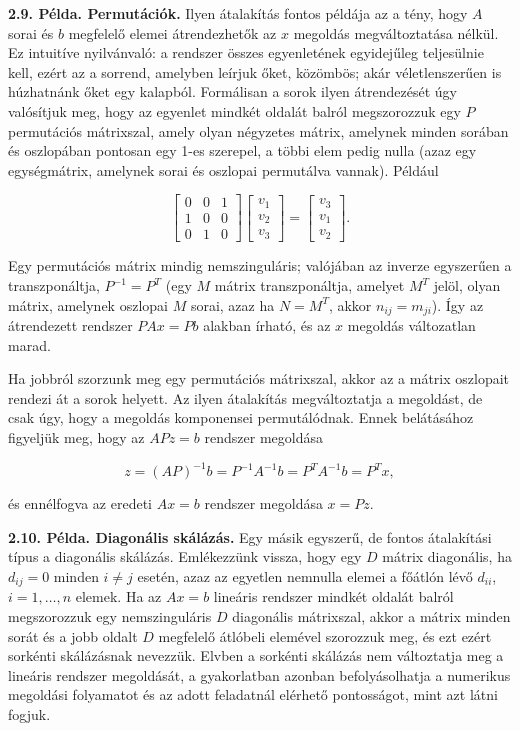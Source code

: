 \documentclass[
  magyar,
  11pt]{article}
\begin{document}
\textbf{2.9. Példa. Permutációk.} Ilyen átalakítás fontos példája az a
tény, hogy \(A\) sorai és \(b\) megfelelő elemei átrendezhetők az \(x\)
megoldás megváltoztatása nélkül. Ez intuitíve nyilvánvaló: a rendszer
összes egyenletének egyidejűleg teljesülnie kell, ezért az a sorrend,
amelyben leírjuk őket, közömbös; akár véletlenszerűen is húzhatnánk őket
egy kalapból. Formálisan a sorok ilyen átrendezését úgy valósítjuk meg,
hogy az egyenlet mindkét oldalát balról megszorozzuk egy \(P\)
permutációs mátrixszal, amely olyan négyzetes mátrix, amelynek minden
sorában és oszlopában pontosan egy 1-es szerepel, a többi elem pedig
nulla (azaz egy egységmátrix, amelynek sorai és oszlopai permutálva
vannak). Például

\[\begin{bmatrix} 0 & 0 & 1 \\ 1 & 0 & 0 \\ 0 & 1 & 0 \end{bmatrix} \begin{bmatrix} v_1 \\ v_2 \\ v_3 \end{bmatrix} = \begin{bmatrix} v_3 \\ v_1 \\ v_2 \end{bmatrix}.\]

Egy permutációs mátrix mindig nemszinguláris; valójában az inverze
egyszerűen a transzponáltja, \(P^{-1} = P^T\) (egy \(M\) mátrix
transzponáltja, amelyet \(M^T\) jelöl, olyan mátrix, amelynek oszlopai
\(M\) sorai, azaz ha \(N = M^T\), akkor \(n_{ij} = m_{ji}\)). Így az
átrendezett rendszer \(PAx = Pb\) alakban írható, és az \(x\) megoldás
változatlan marad.

Ha jobbról szorzunk meg egy permutációs mátrixszal, akkor az a mátrix
oszlopait rendezi át a sorok helyett. Az ilyen átalakítás megváltoztatja
a megoldást, de csak úgy, hogy a megoldás komponensei permutálódnak.
Ennek belátásához figyeljük meg, hogy az \(APz = b\) rendszer megoldása

\[z = (AP)^{-1}b = P^{-1}A^{-1}b = P^{T}A^{-1}b = P^{T}x,\]

és ennélfogva az eredeti \(Ax = b\) rendszer megoldása \(x = Pz\).

\textbf{2.10. Példa. Diagonális skálázás.} Egy másik egyszerű, de fontos
átalakítási típus a diagonális skálázás. Emlékezzünk vissza, hogy egy
\(D\) mátrix diagonális, ha \(d_{ij} = 0\) minden \(i \neq j\) esetén,
azaz az egyetlen nemnulla elemei a főátlón lévő \(d_{ii}\),
\(i = 1, \dots, n\) elemek. Ha az \(Ax = b\) lineáris rendszer mindkét
oldalát balról megszorozzuk egy nemszinguláris \(D\) diagonális
mátrixszal, akkor a mátrix minden sorát és a jobb oldalt \(D\) megfelelő
átlóbeli elemével szorozzuk meg, és ezt ezért sorkénti skálázásnak
nevezzük. Elvben a sorkénti skálázás nem változtatja meg a lineáris
rendszer megoldását, a gyakorlatban azonban befolyásolhatja a numerikus
megoldási folyamatot és az adott feladatnál elérhető pontosságot, mint
azt látni fogjuk.
\end{document}
